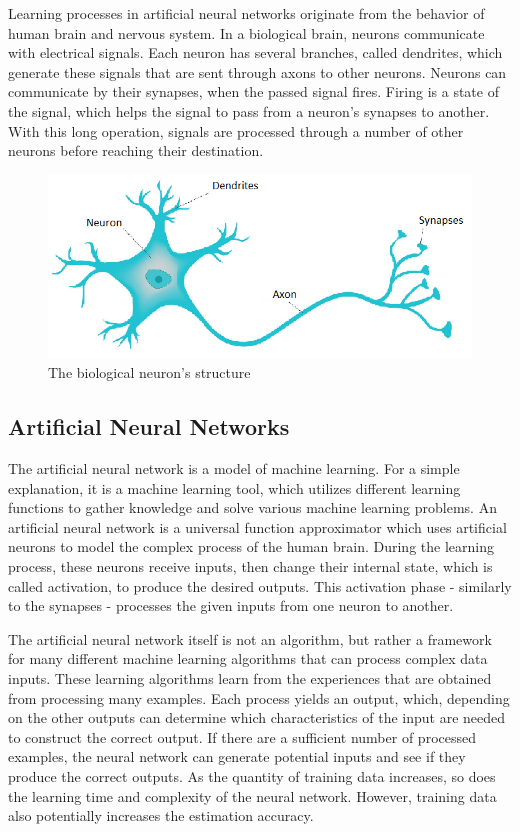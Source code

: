 Learning processes in artificial neural networks originate from the behavior of human brain and nervous system. In a biological brain, neurons communicate with electrical signals. Each neuron has several branches, called dendrites, which generate these signals that are sent through axons to other neurons. Neurons can communicate by their synapses, when the passed signal fires. Firing is a state of the signal, which helps the signal to pass from a neuron's synapses to another. With this long operation, signals are processed through a number of other neurons before reaching their destination.
\begin{figure}[h]
	\centering
	\includegraphics[height=0.35\linewidth]{./figures/neuron2}
	\caption{The biological neuron's structure}
	\label{fig:neuron}
\end{figure}



\subsection{Artificial Neural Networks}

The artificial neural network \cite{priddy2005artificial, anastassiou2011intelligent} is a model of machine learning. For a simple explanation, it is a machine learning tool, which utilizes different learning functions to gather knowledge and solve various machine learning problems. An artificial neural network is a universal function approximator which uses artificial neurons to model the complex process of the human brain. During the learning process, these neurons receive inputs, then change their internal state, which is called activation, to produce the desired outputs. This activation phase - similarly to the synapses - processes the given inputs from one neuron to another. \medskip

The artificial neural network itself is not an algorithm, but rather a framework for many different machine learning algorithms that can process complex data inputs. These learning algorithms learn from the experiences that are obtained from processing many examples. Each process yields an output, which, depending on the other outputs can determine which characteristics of the input are needed to construct the correct output. If there are a sufficient number of processed examples, the neural network can generate potential inputs and see if they produce the correct outputs. As the quantity of training data increases, so does the learning time and complexity of the neural network. However, training data also potentially increases the estimation accuracy. \medskip

